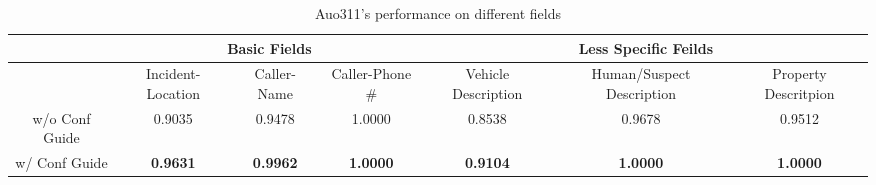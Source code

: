 \begin{table}[t]
\centering
\caption{Auo311's performance on different fields}
\scriptsize
\begin{tabular}{||c|ccccccccc||}
\hline
                  & \multicolumn{3}{c|}{Basic Fields}                                                                                                                                                                                                                                                                                           & \multicolumn{6}{c||}{Less Specific Feilds}                                                                                                                                                                                  \\ \hline\hline
                  & \multicolumn{1}{c|}{Incident-Location}                                                                & \multicolumn{1}{c|}{Caller-Name}                                                                           & \multicolumn{1}{c|}{Caller-Phone \#}                                                                   & \multicolumn{2}{c|}{Vehicle Description}                                       & \multicolumn{2}{c|}{Human/Suspect Description}                                 & \multicolumn{2}{c||}{Property Descritpion}                \\ \hline
w/o Conf Guide    & \multicolumn{1}{c|}{0.9035}                                                                           & \multicolumn{1}{c|}{0.9478}                                                                                & \multicolumn{1}{c|}{1.0000}                                                                            & \multicolumn{2}{c|}{0.8538}                                                    & \multicolumn{2}{c|}{0.9678}                                                    & \multicolumn{2}{c||}{0.9512}                              \\ \hline
w/ Conf Guide     & \multicolumn{1}{c|}{\textbf{0.9631}}                                                                  & \multicolumn{1}{c|}{\textbf{0.9962}}                                                                       & \multicolumn{1}{c|}{\textbf{1.0000}}                                                                   & \multicolumn{2}{c|}{\textbf{0.9104}}                                           & \multicolumn{2}{c|}{\textbf{1.0000}}                                           & \multicolumn{2}{c||}{\textbf{1.0000}}                     \\ \hline\hline

\end{tabular}
\end{table}
